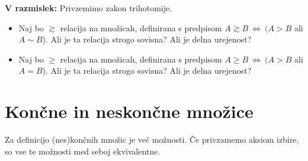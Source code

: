 \documentclass[11pt,paper=b5,DIV=13,headinclude,footinclude]{scrbook}
\def\cee {{~\Leftrightarrow~}}
\begin{document}
\textbf{V razmislek:}
Privzemimo zakon trihotomije.
\begin{itemize}
    \item Naj bo $\gtrsim$ relacija na množicah, definirana s predpisom $A\gtrsim B\cee (A>B$ ali $A\sim B$).
     Ali je ta relacija strogo sovisna? Ali je delna urejenost?

    \item Naj bo $\ge$ relacija na množicah, definirana s predpisom $A\ge B\cee (A>B$ ali $A= B$).
     Ali je ta relacija strogo sovisna? Ali je delna urejenost?
\end{itemize}

\chapter{Končne in neskončne množice}

Za definicijo (nes)končnih množic je več možnosti. Če privzamemo aksiom izbire, so vse te možnosti med seboj ekvivalentne.
\end{document}
